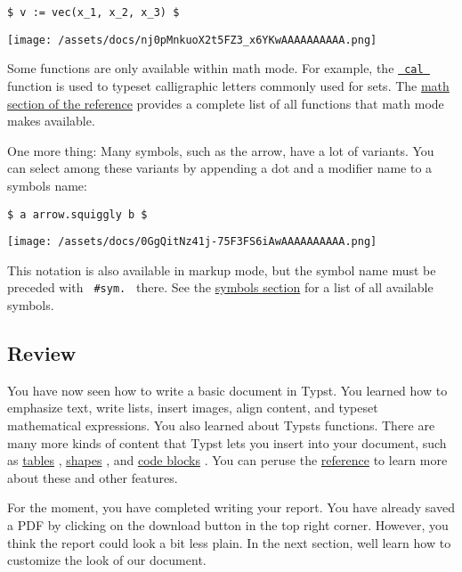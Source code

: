 \begin{verbatim}
$ v := vec(x_1, x_2, x_3) $
\end{verbatim}

\texttt{[image: /assets/docs/nj0pMnkuoX2t5FZ3\_x6YKwAAAAAAAAAA.png]}

Some functions are only available within math mode. For example, the
\href{/docs/reference/math/variants/\#functions-cal}{\texttt{\ cal\ }}
function is used to typeset calligraphic letters commonly used for sets.
The \href{/docs/reference/math/}{math section of the reference} provides
a complete list of all functions that math mode makes available.

One more thing: Many symbols, such as the arrow, have a lot of variants.
You can select among these variants by appending a dot and a modifier
name to a symbol\textquotesingle s name:

\begin{verbatim}
$ a arrow.squiggly b $
\end{verbatim}

\texttt{[image: /assets/docs/0GgQitNz41j-75F3FS6iAwAAAAAAAAAA.png]}

This notation is also available in markup mode, but the symbol name must
be preceded with \texttt{\ \#sym.\ } there. See the
\href{/docs/reference/symbols/sym/}{symbols section} for a list of all
available symbols.

\subsection{Review}\label{review}

You have now seen how to write a basic document in Typst. You learned
how to emphasize text, write lists, insert images, align content, and
typeset mathematical expressions. You also learned about
Typst\textquotesingle s functions. There are many more kinds of content
that Typst lets you insert into your document, such as
\href{/docs/reference/model/table/}{tables} ,
\href{/docs/reference/visualize/}{shapes} , and
\href{/docs/reference/text/raw/}{code blocks} . You can peruse the
\href{/docs/reference/}{reference} to learn more about these and other
features.

For the moment, you have completed writing your report. You have already
saved a PDF by clicking on the download button in the top right corner.
However, you think the report could look a bit less plain. In the next
section, we\textquotesingle ll learn how to customize the look of our
document.

